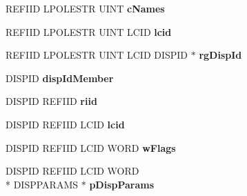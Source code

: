 \begin{DoxyCompactItemize}
\item 
\hypertarget{struct_i_badge_icon_syncing_vtbl_a1b0239a9aa2fdb67993896332d2f3e4b}{R\-E\-F\-I\-I\-D L\-P\-O\-L\-E\-S\-T\-R U\-I\-N\-T {\bfseries c\-Names}}\label{struct_i_badge_icon_syncing_vtbl_a1b0239a9aa2fdb67993896332d2f3e4b}

\item 
\hypertarget{struct_i_badge_icon_syncing_vtbl_acd9facd47d7a5263c48145a2bda0e508}{R\-E\-F\-I\-I\-D L\-P\-O\-L\-E\-S\-T\-R U\-I\-N\-T L\-C\-I\-D {\bfseries lcid}}\label{struct_i_badge_icon_syncing_vtbl_acd9facd47d7a5263c48145a2bda0e508}

\item 
\hypertarget{struct_i_badge_icon_syncing_vtbl_a2a473276d297a92f3b8a9a02c7ce4e4a}{R\-E\-F\-I\-I\-D L\-P\-O\-L\-E\-S\-T\-R U\-I\-N\-T L\-C\-I\-D D\-I\-S\-P\-I\-D $\ast$ {\bfseries rg\-Disp\-Id}}\label{struct_i_badge_icon_syncing_vtbl_a2a473276d297a92f3b8a9a02c7ce4e4a}

\item 
\hypertarget{struct_i_badge_icon_syncing_vtbl_a6f21b981191a452bb2777bf1472c2283}{D\-I\-S\-P\-I\-D {\bfseries disp\-Id\-Member}}\label{struct_i_badge_icon_syncing_vtbl_a6f21b981191a452bb2777bf1472c2283}

\item 
\hypertarget{struct_i_badge_icon_syncing_vtbl_aef448512c7e96c6fcfdce34c2681312b}{D\-I\-S\-P\-I\-D R\-E\-F\-I\-I\-D {\bfseries riid}}\label{struct_i_badge_icon_syncing_vtbl_aef448512c7e96c6fcfdce34c2681312b}

\item 
\hypertarget{struct_i_badge_icon_syncing_vtbl_ada51cc0b4c57c8c680559d23911b950d}{D\-I\-S\-P\-I\-D R\-E\-F\-I\-I\-D L\-C\-I\-D {\bfseries lcid}}\label{struct_i_badge_icon_syncing_vtbl_ada51cc0b4c57c8c680559d23911b950d}

\item 
\hypertarget{struct_i_badge_icon_syncing_vtbl_afbb7646da1d3422b7415eb45cef8a7ba}{D\-I\-S\-P\-I\-D R\-E\-F\-I\-I\-D L\-C\-I\-D W\-O\-R\-D {\bfseries w\-Flags}}\label{struct_i_badge_icon_syncing_vtbl_afbb7646da1d3422b7415eb45cef8a7ba}

\item 
\hypertarget{struct_i_badge_icon_syncing_vtbl_a7c197f7adeb7e5eb2844200588d57e26}{D\-I\-S\-P\-I\-D R\-E\-F\-I\-I\-D L\-C\-I\-D W\-O\-R\-D \\*
D\-I\-S\-P\-P\-A\-R\-A\-M\-S $\ast$ {\bfseries p\-Disp\-Params}}\label{struct_i_badge_icon_syncing_vtbl_a7c197f7adeb7e5eb2844200588d57e26}


\end{DoxyCompactItemize}
